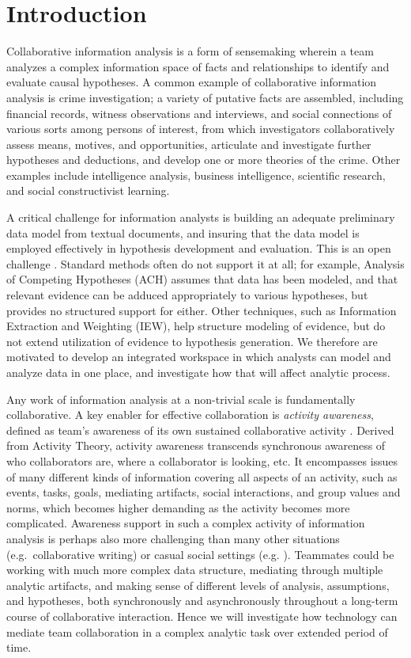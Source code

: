 \section{Introduction}\label{introduction}

Collaborative information analysis is a form of sensemaking wherein a
team analyzes a complex information space of facts and relationships to
identify and evaluate causal hypotheses. A common example of
collaborative information analysis is crime investigation; a variety of
putative facts are assembled, including financial records, witness
observations and interviews, and social connections of various sorts
among persons of interest, from which investigators collaboratively
assess means, motives, and opportunities, articulate and investigate
further hypotheses and deductions, and develop one or more theories of
the crime. Other examples include intelligence analysis, business
intelligence, scientific research, and social constructivist learning.

A critical challenge for information analysts is building an adequate
preliminary data model from textual documents, and insuring that the
data model is employed effectively in hypothesis development and
evaluation. This is an open challenge \autocite{Badalamente2005}.
Standard methods often do not support it at all; for example, Analysis
of Competing Hypotheses (ACH) assumes that data has been modeled, and
that relevant evidence can be adduced appropriately to various
hypotheses, but provides no structured support for either. Other
techniques, such as Information Extraction and Weighting (IEW), help
structure modeling of evidence, but do not extend utilization of
evidence to hypothesis generation. We therefore are motivated to develop
an integrated workspace in which analysts can model and analyze data in
one place, and investigate how that will affect analytic process.

Any work of information analysis at a non-trivial scale is fundamentally
collaborative. A key enabler for effective collaboration is
\emph{activity awareness}, defined as team's awareness of its own
sustained collaborative activity \autocite{Carroll2006}. Derived from
Activity Theory, activity awareness transcends synchronous awareness of
who collaborators are, where a collaborator is looking, etc. It
encompasses issues of many different kinds of information covering all
aspects of an activity, such as events, tasks, goals, mediating
artifacts, social interactions, and group values and norms, which
becomes higher demanding as the activity becomes more complicated.
Awareness support in such a complex activity of information analysis is
perhaps also more challenging than many other situations
(e.g.~collaborative writing) or casual social settings (e.g.
\autocite{Greenberg2001}). Teammates could be working with much more
complex data structure, mediating through multiple analytic artifacts,
and making sense of different levels of analysis, assumptions, and
hypotheses, both synchronously and asynchronously throughout a long-term
course of collaborative interaction. Hence we will investigate how
technology can mediate team collaboration in a complex analytic task
over extended period of time.

